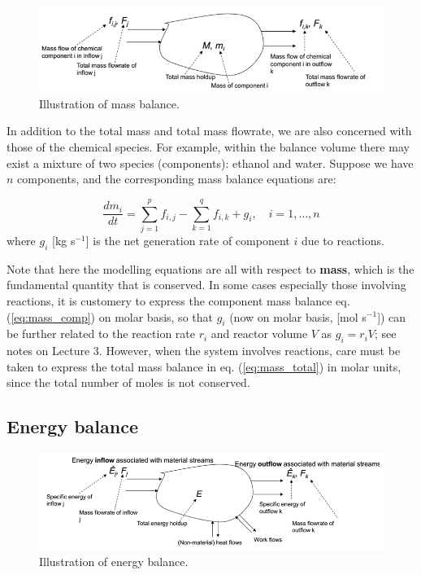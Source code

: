 \documentclass[a4paper,11pt]{article}
\theoremstyle{definition}
\begin{document}
\begin{figure}[!h]
 \begin{center}
	\includegraphics[width=.8\textwidth]{mass}
 \end{center}
 \caption{Illustration of mass balance.} 
 \label{fig:mass}
\end{figure}

In addition to the total mass and total mass flowrate, we are also concerned with those of the chemical species.
For example, within the balance volume there may exist a mixture of two species (components): ethanol and water.
Suppose we have $n$ components, and the corresponding mass balance equations are:

\begin{equation} \label{eq:mass_comp}
	\frac{d m_i}{d t} = \sum_{j=1}^p f_{i,j} - \sum_{k=1}^q f_{i,k} + g_i, \quad i = 1, \ldots, n
\end{equation}
\noindent where $g_i$ [kg s$^{-1}$] is the net generation rate of component $i$ due to reactions.

Note that here the modelling equations are all with respect to \textbf{mass}, which is the fundamental
quantity that is conserved. In some cases especially those involving reactions, it is customery to
express the component mass balance eq. (\ref{eq:mass_comp}) on molar basis,
so that $g_i$ (now on molar basis, [mol s$^{-1}$]) can be further related to the reaction rate $r_i$
and reactor volume $V$ as $g_i = r_i V$; see notes on Lecture 3.
However, when the system involves reactions, care must be taken to express the total mass balance in eq. (\ref{eq:mass_total}) in molar units,
since the total number of moles is not conserved.

\subsection*{Energy balance}

\begin{figure}[!h]
 \begin{center}
	\includegraphics[width=.8\textwidth]{energy}
 \end{center}
 \caption{Illustration of energy balance.} 
 \label{fig:energy}
\end{figure}
\end{document}
